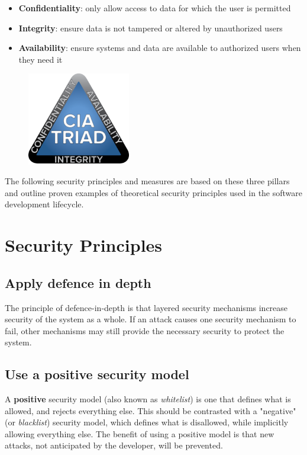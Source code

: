 \documentclass[a5paper,pagesize,10pt,bibtotoc,DIV=10,twoside]{scrbook}
\begin{document}
\begin{itemize}
\item \textbf{Confidentiality}: only allow access to data for which the user is permitted
\item \textbf{Integrity}: ensure data is not tampered or altered by unauthorized users
\item \textbf{Availability}: ensure systems and data are available to authorized users when they need it
\end{itemize}

\begin{figure}
\includegraphics[width=0.4\textwidth]{images/CIA}
\end{figure}

The following security principles and measures are based on these three pillars and outline proven examples of theoretical security principles used in the software development lifecycle.\\

\section{Security Principles}

\subsection{Apply defence in depth}
The principle of defence-in-depth is that layered security mechanisms increase security of the system as a whole. If an attack causes one security mechanism to fail, other mechanisms may still provide the necessary security to protect the system.

\subsection{Use a positive security model}
A \textbf{positive} security model (also known as \textit{whitelist}) is one that defines what is allowed, and rejects everything else. This should be contrasted with a "negative" (or \textit{blacklist}) security model, which defines what is disallowed, while implicitly allowing everything else. The benefit of using a positive model is that new attacks, not anticipated by the developer, will be prevented. 
\end{document}
